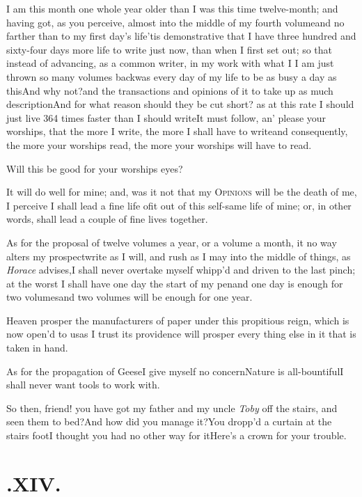 \documentclass{article}
\begin{document}
I am this month one whole year older than I was this time twelve-month; and having
got, as you perceive, almost into the middle of my fourth volume\tsk and no farther
than to my first day’s life\tsk\break ’tis demonstrative that I have three hundred and
sixty-four days more life to write just now, than when I first set out; so that
instead of advancing, as a common writer, in my work with
what I\pb{} I am just thrown so many volumes
back\break\tsk was every day of my
life to be as busy a day as this\tsk And why not?\tsk and the transactions and opinions
of it to take up as much description\tsk And for what reason should they be cut short?
as at this rate I should just live 364 times faster than I should write\tsk It must
follow, an’ please your worships, that the more I write, the more I shall have to
write\tsk and consequently, the more your worships read, the more your worships will
have to read.

Will this be good for your worships eyes?

It will do well for mine; and, was it not that my
\textsc{Opinions} will be the death of me, I perceive I shall
lead a fine life of\pb it out of this self-same life of mine; or, in
other words, shall lead a couple of fine lives together.

As for the proposal of twelve volumes a year, or a volume a month, it no way alters my
prospect\tsk write as I will, and rush as I may into the middle
of things, as \textit{Horace} advises,\tsk I shall never overtake
myself whipp’d and driven to the last pinch; at the worst I
shall have one day the start of my pen\tsk and one day is enough
for two volumes\tsk and two volumes will be enough for one
year.\tsk

Heaven prosper the manufacturers of paper under this propitious
reign, which is now open’d to us\tsk as I trust its
providence will prosper every thing else in it that is taken in
hand.\tsk

\newpage

As for the propagation of Geese\tsk I give myself no
concern\tsk Nature is all-bountiful\tsk I shall never want
tools to work with.

\tsk So then, friend! you have got my father and my uncle
\textit{Toby} off the stairs, and seen them to bed?\tsh And
how did you manage it?\tsh You dropp’d a curtain at
the stairs foot\tsk I thought you had no other way for
it\tsh Here’s a crown for your trouble.

\smallskip
\section{.\enspace XIV.}
\end{document}
